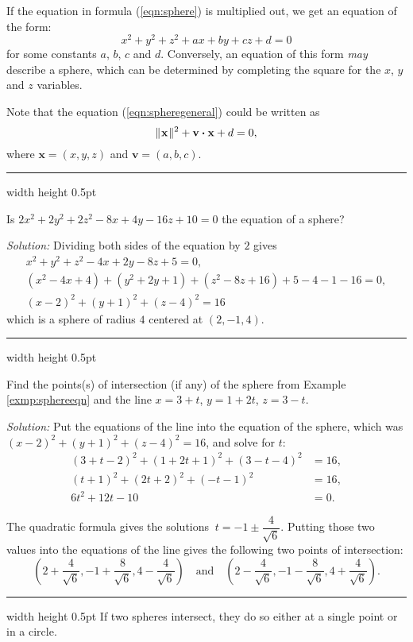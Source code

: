 If the equation in formula (\ref{eqn:sphere}) is multiplied out, we get an equation of the form:
\begin{equation}\label{eqn:spheregeneral}
 x^2 + y^2 + z^2 + ax + by + cz + d = 0
\end{equation}
for some constants $a$, $b$, $c$ and $d$. Conversely, an equation of this form
\emph{may} describe a sphere, which can be determined by completing the
square for the $x$, $y$ and $z$ variables.

Note that the equation (\ref{eqn:spheregeneral}) could be written as 
\[\lVert\mspace{1mu}\textbf{x}\mspace{1mu}\rVert^2+\textbf{v} \bm{\cdot} \textbf{x}+d=0,
\]
where $\textbf{x}=(x,y,z)$ and $\textbf{v}=(a,b,c)$.

\vspace{2mm}
\hrule width \textwidth height 0.5pt
\begin{exmp}\label{exmp:sphereeqn}
 Is $2x^2 + 2y^2 + 2z^2 - 8x + 4y - 16z + 10 = 0$ the equation of a sphere?\vspace{1mm}
 \par\noindent\emph{Solution:} Dividing both sides of the equation by $2$ gives
 \begin{gather*}
  x^2 + y^2 + z^2 - 4x + 2y - 8z + 5 = 0,\\
  (x^2 - 4x + 4) + (y^2 + 2y + 1) + (z^2 - 8z + 16) + 5 - 4 - 1 - 16 = 0,\\
  (x - 2)^2 + (y + 1)^2 + (z - 4)^2 = 16
 \end{gather*}
 which is a sphere of radius $4$ centered at $(2,-1,4)$.
\end{exmp}
\hrule width \textwidth height 0.5pt
\begin{exmp}\label{exmp:sphereline}
 Find the points(s) of intersection (if any) of the sphere from Example \ref{exmp:sphereeqn} and the line
 $x = 3 + t$, $y = 1 + 2t$, $z = 3 - t$.\vspace{1mm}
 \par\noindent\emph{Solution:} Put the equations of the line into the equation of the sphere, which was
 $(x - 2)^2 + (y + 1)^2 + (z - 4)^2 = 16$, and solve for $t$:
 \begin{align*}
  (3 + t - 2)^2 + (1 + 2t + 1)^2 + (3 - t - 4)^2 &= 16,\\
  (t + 1)^2 + (2t + 2)^2 + (-t - 1)^2 &= 16,\\
  6t^2 + 12t -10 &= 0.
 \end{align*}
 \par\noindent The quadratic formula gives the solutions $~t = -1 \pm \dfrac{4}{\sqrt{6}}$. Putting those
 two values into the equations of the line gives the following two points of intersection:
 \begin{displaymath}
  \left( 2 + \frac{4}{\sqrt{6}}, -1 + \frac{8}{\sqrt{6}}, 4 - \frac{4}{\sqrt{6}} \right) \quad \text{and} \quad
  \left( 2 - \frac{4}{\sqrt{6}}, -1 - \frac{8}{\sqrt{6}}, 4 + \frac{4}{\sqrt{6}} \right).
 \end{displaymath}
\end{exmp}
\hrule width \textwidth height 0.5pt
\pagebreak[3]
If two spheres intersect, they do so either at a single point or in a circle.

